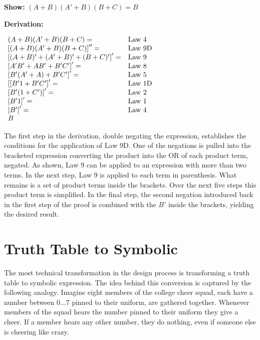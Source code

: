 \textbf{Show:} $(A+B)(A'+B)(B+C) = B$

\textbf{Derivation:}

$
\begin{array}[ht]{ll}
(A+B)(A'+B)(B+C) =             & \text{Law 4} \\
\left[ (A+B)(A'+B)(B+C) \right] '' =& \text{Law 9D} \\
\left[ (A+B)'+(A'+B)'+(B+C)' \right]' = & \text{Law 9} \\
\left[ A'B'+AB'+B'C' \right]' =     & \text{Law 8} \\
\left[ B'(A'+A)+B'C' \right]' =     & \text{Law 5} \\
\left[ [B'1+ B'C' \right]' =         & \text{Law 1D} \\
\left[ B'(1+C') \right]' =         & \text{Law 2} \\
\left[ B'1 \right]' =             & \text{Law 1} \\
\left[ B' \right]' =             & \text{Law 4} \\
B  &
\end{array}$

The first step in the derivation, double negating the expression, establishes
the conditions for the application of Law 9D. One of the negations is
pulled into the bracketed expression converting the product into
the OR of each product term, negated.  As shown, Law 9 can be applied
to an expression with more than two terms.  In the next step, Law 9 is
applied to each term in parenthesis.  What remains is a set of product
terms inside the brackets.  Over the next five steps this product term
is simplified.  In the final step, the second negation introduced
back in the first step of the proof is combined with the $B'$
inside the brackets, yielding the desired result.

\section{Truth Table to Symbolic}
\label{sec:representationsTTtoSymb}

The most technical transformation in the design process is transforming
a truth table to symbolic expression.  The idea behind this conversion is
captured by the following analogy.  Imagine eight members of the college
cheer squad, each have a number between $0 \ldots 7$ pinned to their
uniform, are gathered together.  Whenever members of the squad hears
the number pinned to their uniform they give a cheer.  If a member hears
any other number, they do nothing, even if someone else is cheering like crazy.

